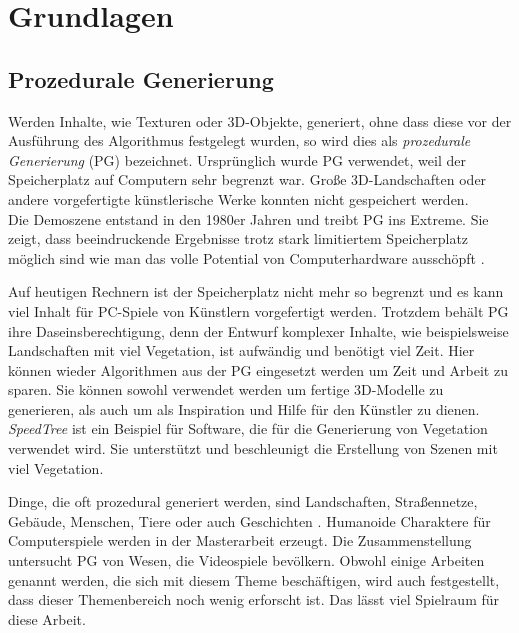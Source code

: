 \chapter{Grundlagen}

\section{Prozedurale Generierung}

Werden Inhalte, wie Texturen oder 3D-Objekte, generiert, ohne dass diese vor der Ausführung des Algorithmus festgelegt wurden, so wird dies als \emph{prozedurale Generierung} (PG) bezeichnet.
Ursprünglich wurde PG verwendet, weil der Speicherplatz auf Computern sehr begrenzt war. Große 3D-Landschaften oder andere vorgefertigte künstlerische Werke konnten nicht gespeichert werden.\\
Die Demoszene entstand in den 1980er Jahren und treibt PG ins Extreme. Sie zeigt, dass beeindruckende Ergebnisse trotz stark limitiertem Speicherplatz möglich sind \bzw wie man das volle Potential von Computerhardware ausschöpft  \cite{DemoScene}. 

Auf heutigen Rechnern ist der Speicherplatz nicht mehr so begrenzt und es kann viel Inhalt für \zb PC-Spiele von Künstlern vorgefertigt werden. Trotzdem behält PG ihre Daseinsberechtigung, denn der Entwurf komplexer Inhalte, wie beispielsweise Landschaften mit viel Vegetation, ist aufwändig und benötigt viel Zeit. Hier können wieder Algorithmen aus der PG eingesetzt werden um Zeit und Arbeit zu sparen. Sie können sowohl verwendet werden um fertige 3D-Modelle zu generieren, als auch um als Inspiration und Hilfe für den Künstler zu dienen. \emph{SpeedTree} \cite{SpeedTree} ist ein Beispiel für Software, die für die Generierung von Vegetation verwendet wird. Sie unterstützt und beschleunigt die Erstellung von Szenen mit viel Vegetation. \cite{PCGSurvey_videoGames}

Dinge, die oft prozedural generiert werden, sind Landschaften, Straßennetze, Gebäude, Menschen, Tiere oder auch Geschichten \cite{PCGSurvey}. Humanoide Charaktere für Computerspiele werden \zb in der Masterarbeit \cite{ProceduralCharacterGeneration} erzeugt. Die Zusammenstellung \cite{PCGSurvey_videoGames} untersucht PG von Wesen, die Videospiele bevölkern. Obwohl einige Arbeiten genannt werden, die sich mit diesem Theme beschäftigen, wird auch festgestellt, dass dieser Themenbereich noch wenig erforscht ist. Das lässt viel Spielraum für diese Arbeit.


